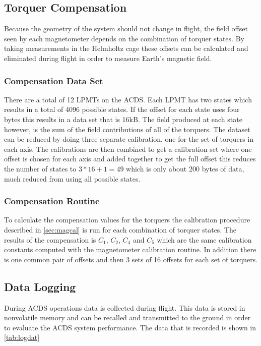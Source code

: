 \subsection{Torquer Compensation}

Because the geometry of the system should not change in flight, the field offset seen by each magnetometer depends on the combination of torquer states. By taking measurements in the Helmholtz cage these offsets can be calculated and eliminated during flight in order to measure Earth's magnetic field.

\subsubsection{Compensation Data Set}

There are a total of 12 \acp{LPMT} on the \ac{ACDS}. Each \ac{LPMT} has two states which results in a total of 4096 possible states. If the offset for each state uses four bytes this results in a data set that is 16kB. The field produced at each state however, is the sum of the field contributions of all of the torquers. The dataset can be reduced by doing three separate calibration, one for the set of torquers in each axis. The calibrations are then combined to get a calibration set where one offset is chosen for each axis and added together to get the full offset this reduces the number of states to $3*16 + 1 = 49$ which is only about 200 bytes of data, much reduced from using all possible states.

\subsubsection{Compensation Routine}

To calculate the compensation values for the torquers the calibration procedure described in \cref{sec:magcal} is run for each combination of torquer states. The results of the compensation is $C_1$, $C_2$, $C_4$ and $ C_5$ which are the same calibration constants computed with the magnetometer calibration routine. In addition there is one common pair of offsets and then 3 sets of 16 offsets for each set of torquers.


\subsection{Data Logging}

During \ac{ACDS} operations data is collected during flight. This data is stored in nonvolatile memory and can be recalled and transmitted to the ground in order to evaluate the \ac{ACDS} system performance. The data that is recorded is shown in \cref{tab:logdat}

